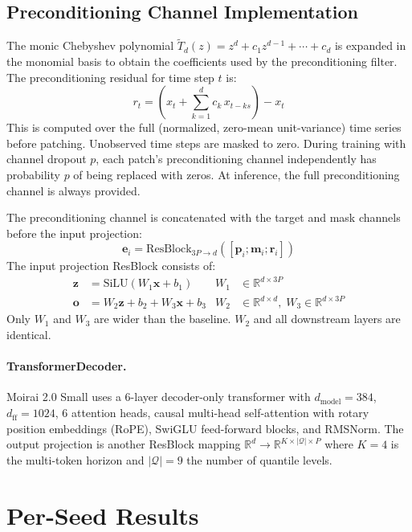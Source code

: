 \documentclass{article}
\begin{document}
\subsection{Preconditioning Channel Implementation}

The monic Chebyshev polynomial $\tilde T_d(z)=z^d+c_1 z^{d-1}+\cdots+c_d$ is expanded in the monomial basis to obtain the coefficients used by the preconditioning filter. The preconditioning residual for time step $t$ is:
\[
r_t = \left(x_t + \sum_{k=1}^{d} c_k \, x_{t-ks}\right) - x_t
\]
This is computed over the full (normalized, zero-mean unit-variance) time series before patching. Unobserved time steps are masked to zero. During training with channel dropout $p$, each patch's preconditioning channel independently has probability $p$ of being replaced with zeros. At inference, the full preconditioning channel is always provided.

The preconditioning channel is concatenated with the target and mask channels before the input projection:
\[
\mathbf{e}_i = \text{ResBlock}_{3P \to d}([\mathbf{p}_i; \mathbf{m}_i; \mathbf{r}_i])
\]
The input projection ResBlock consists of:
\begin{align}
\mathbf{z} &= \text{SiLU}(W_1 \mathbf{x} + b_1) & W_1 &\in \mathbb{R}^{d \times 3P} \\
\mathbf{o} &= W_2 \mathbf{z} + b_2 + W_3 \mathbf{x} + b_3 & W_2 &\in \mathbb{R}^{d \times d}, \; W_3 \in \mathbb{R}^{d \times 3P}
\end{align}
Only $W_1$ and $W_3$ are wider than the baseline. $W_2$ and all downstream layers are identical.

\paragraph{TransformerDecoder.} Moirai 2.0 Small uses a 6-layer decoder-only transformer with $d_{\mathrm{model}} = 384$, $d_{\mathrm{ff}} = 1024$, 6 attention heads, causal multi-head self-attention with rotary position embeddings (RoPE), SwiGLU feed-forward blocks, and RMSNorm. The output projection is another ResBlock mapping $\mathbb{R}^d \to \mathbb{R}^{K \times |\mathcal{Q}| \times P}$ where $K{=}4$ is the multi-token horizon and $|\mathcal{Q}|{=}9$ the number of quantile levels.

\section{Per-Seed Results}
\label{app:seeds}
\end{document}
